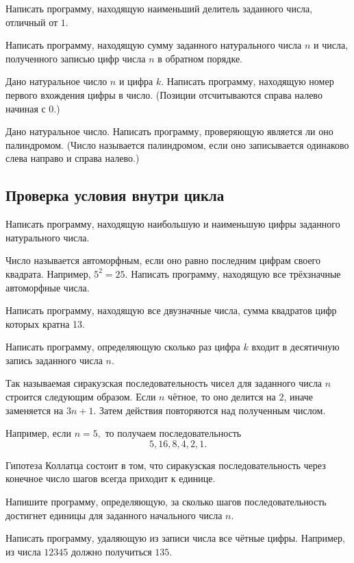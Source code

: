 \task Написать программу, находящую наименьший делитель заданного
числа, отличный от $1.$

\task Написать программу, находящую сумму заданного натурального числа
$n$ и числа, полученного записью цифр числа $n$ в обратном порядке.

\task Дано натуральное число $n$ и цифра $k.$ Написать программу,
находящую номер первого вхождения цифры в число. (Позиции
отсчитываются справа налево начиная с 0.)

\task Дано натуральное число. Написать программу, проверяющую является
ли оно палиндромом. (Число называется палиндромом, если
оно записывается одинаково слева направо и справа налево.)


\subsection{Проверка условия внутри цикла}

\task Написать программу, находящую наибольшую и наименьшую цифры
заданного натурального числа.

\task Число называется автоморфным, если оно
равно последним цифрам своего квадрата. Например, $5^2=25$. Написать
программу, находящую все трёхзначные автоморфные числа.

\task Написать программу, находящую все двузначные числа, сумма
квадратов цифр которых кратна 13.

\task Написать программу, определяющую сколько раз цифра $k$ входит в
десятичную запись заданного числа $n$.

\task Так называемая сиракузская
последовательность чисел для
заданного числа $n$ строится следующим образом. Если $n$ чётное, то
оно делится на $2$, иначе заменяется на $3n+1$. Затем действия
повторяются над полученным числом.

Например, если $n=5,$ то получаем последовательность
\[
5, 16, 8, 4, 2, 1.
\]

Гипотеза Коллатца состоит в том, что
сиракузская последовательность через конечное число шагов всегда
приходит к единице.

Напишите программу, определяющую, за сколько шагов последовательность
достигнет единицы для заданного начального числа $n$.

\task Написать программу, удаляющую из записи числа все чётные
цифры. Например, из числа $12345$ должно получиться $135$.

